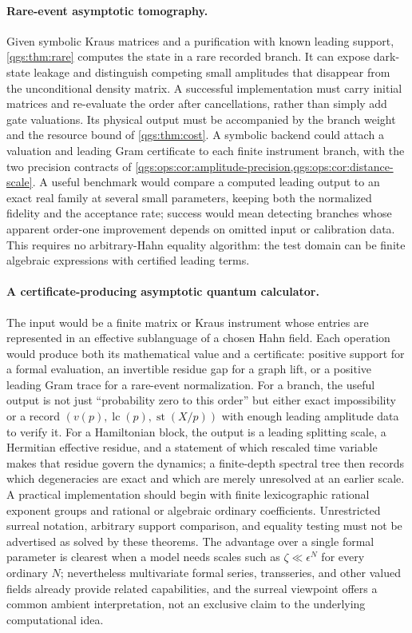 \documentclass[11pt,oneside]{article}
\numberwithin{equation}{section}
\theoremstyle{plain}
\theoremstyle{definition}
\theoremstyle{remark}
\DeclareMathOperator{\st}{st}
\DeclareMathOperator{\lc}{lc}
\begin{document}
\paragraph{Rare-event asymptotic tomography.}
Given symbolic Kraus matrices and a purification with known leading support, \cref{qgs:thm:rare} computes the state in a rare recorded branch. It can expose dark-state leakage and distinguish competing small amplitudes that disappear from the unconditional density matrix. A successful implementation must carry initial matrices and re-evaluate the order after cancellations, rather than simply add gate valuations. Its physical output must be accompanied by the branch weight and the resource bound of \cref{qgs:thm:cost}. A symbolic backend could attach a valuation and leading Gram certificate to each finite instrument branch, with the two precision contracts of \cref{qgs:ops:cor:amplitude-precision,qgs:ops:cor:distance-scale}. A useful benchmark would compare a computed leading output to an exact real family at several small parameters, keeping both the normalized fidelity and the acceptance rate; success would mean detecting branches whose apparent order-one improvement depends on omitted input or calibration data. This requires no arbitrary-Hahn equality algorithm: the test domain can be finite algebraic expressions with certified leading terms.

\paragraph{A certificate-producing asymptotic quantum calculator.}
The input would be a finite matrix or Kraus instrument whose entries are represented in an effective sublanguage of a chosen Hahn field. Each operation would produce both its mathematical value and a certificate: positive support for a formal evaluation, an invertible residue gap for a graph lift, or a positive leading Gram trace for a rare-event normalization. For a branch, the useful output is not just ``probability zero to this order'' but either exact impossibility or a record $(v(p),\lc(p),\st(X/p))$ with enough leading amplitude data to verify it. For a Hamiltonian block, the output is a leading splitting scale, a Hermitian effective residue, and a statement of which rescaled time variable makes that residue govern the dynamics; a finite-depth spectral tree then records which degeneracies are exact and which are merely unresolved at an earlier scale. A practical implementation should begin with finite lexicographic rational exponent groups and rational or algebraic ordinary coefficients. Unrestricted surreal notation, arbitrary support comparison, and equality testing must not be advertised as solved by these theorems. The advantage over a single formal parameter is clearest when a model needs scales such as $\zeta\ll\epsilon^N$ for every ordinary $N$; nevertheless multivariate formal series, transseries, and other valued fields already provide related capabilities, and the surreal viewpoint offers a common ambient interpretation, not an exclusive claim to the underlying computational idea.
\end{document}
